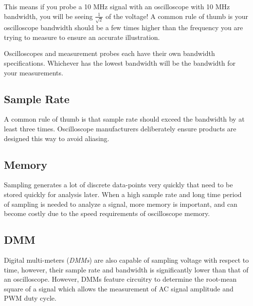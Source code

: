 \documentclass[main.tex]{subfiles}
\begin{document}
This means if you probe a 10 MHz signal with an oscilloscope with 10 MHz bandwidth, you will be seeing $\frac{1}{\sqrt{2}}$ of the voltage! A common rule of thumb is your oscilloscope bandwidth should be a few times higher than the frequency you are trying to measure to ensure an accurate illustration.

Oscilloscopes and measurement probes each have their own bandwidth specifications. Whichever has the lowest bandwidth will be the bandwidth for your measurements.

\subsection{Sample Rate}
A common rule of thumb is that sample rate should exceed the bandwidth by at least three times. Oscilloscope manufacturers deliberately ensure products are designed this way to avoid aliasing.

\subsection{Memory}
Sampling generates a lot of discrete data-points very quickly that need to be stored quickly for analysis later. When a high sample rate and long time period of sampling is needed to analyze a signal, more memory is important, and can become costly due to the speed requirements of oscilloscope memory.

\subsection{DMM}
Digital multi-meters (\textit{DMMs}) are also capable of sampling voltage with respect to time, however, their sample rate and bandwidth is significantly lower than that of an oscilloscope. However, DMMs feature circuitry to determine the root-mean square of a signal which allows the measurement of AC signal amplitude and PWM duty cycle.
\end{document}
